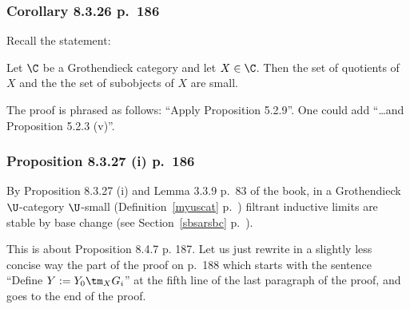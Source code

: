 \documentclass[12pt]{article}
\theoremstyle{remark}
\theoremstyle{definition}
\begin{document}
%

\subsubsection{Corollary 8.3.26 p.~186}
 
Recall the statement:

Let $\C$ be a Grothendieck category and let $X\in\C$. Then the set of quotients of $X$ and the the set of subobjects of $X$ are small. 

The proof is phrased as follows: ``Apply Proposition 5.2.9''. One could add ``\dots and Proposition 5.2.3 (v)''.

%

\subsubsection{Proposition 8.3.27 (i) p.~186}

By Proposition 8.3.27 (i) and Lemma 3.3.9 p.~83 of the book, in a Grothendieck $\U$-category $\U$-small (Definition~\ref{myuscat} p.~) filtrant inductive limits are stable by base change (see Section~\ref{sbsarsbc} p.~).



This is about Proposition 8.4.7 p. 187. Let us just rewrite in a slightly less concise way the part of the proof on p.~188 which starts with the sentence ``Define $Y:=Y_0\tm_XG_i$'' at the fifth line of the last paragraph of the proof, and goes to the end of the proof. 
\end{document}

